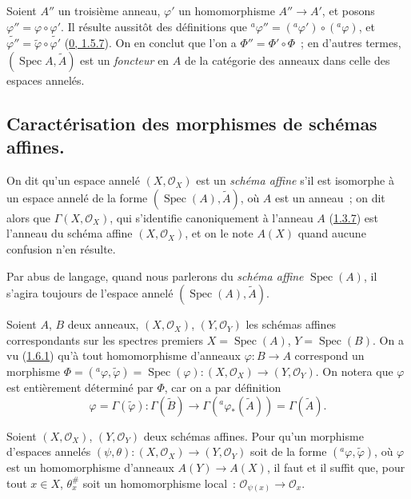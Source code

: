 \begin{env}[1.6.10]
\label{I.1.6.10-fr}
Soient $A''$ un troisième anneau, $\varphi'$ un homomorphisme
$A''\to A'$, et posons $\varphi''=\varphi\circ\varphi'$. Il résulte
aussitôt des définitions que
${}^a\varphi''=({}^a\varphi')\circ({}^a\varphi)$, et
$\widetilde{\varphi''}=\widetilde\varphi\circ\widetilde{\varphi'}$
(\hyperref[0.1.5.7-fr]{0, 1.5.7}). On en conclut que l'on a
$\Phi''=\Phi'\circ\Phi$~; en d'autres termes,
$(\operatorname{Spec} A,\widetilde A)$ est un \emph{foncteur} en $A$ de la
catégorie des anneaux dans celle des espaces annelés.
\end{env}

\subsection{Caractérisation des morphismes de schémas affines.}
\label{subsection:I.1.7-fr}

\begin{definition}[1.7.1]
\label{I.1.7.1-fr}
On dit qu'un espace annelé $(X,\mathscr{O}_X)$ est un \emph{schéma affine}
s'il est isomorphe à un espace annelé de la forme
$(\operatorname{Spec}(A),\widetilde A)$, où $A$ est un anneau~; on dit alors
que $\Gamma(X,\mathscr{O}_X)$, qui s'identifie canoniquement à l'anneau $A$
(\hyperref[I.1.3.7-fr]{1.3.7}) est l'anneau du schéma affine
$(X,\mathscr{O}_X)$, et on le note $A(X)$ quand aucune confusion n'en résulte.
\end{definition}

Par abus de langage, quand nous parlerons du \emph{schéma affine}
$\operatorname{Spec}(A)$, il s'agira toujours de l'espace annelé
$(\operatorname{Spec}(A),\widetilde A)$.

\begin{env}[1.7.2]
\label{I.1.7.2-fr}
Soient $A$, $B$ deux anneaux, $(X,\mathscr{O}_X)$,
$(Y,\mathscr{O}_Y)$ les schémas affines correspondants sur les spectres
premiers $X=\operatorname{Spec}(A)$, $Y=\operatorname{Spec}(B)$. On a vu
(\hyperref[I.1.6.1-fr]{1.6.1}) qu'à tout homomorphisme d'anneaux
$\varphi:B\to A$ correspond un morphisme
$\Phi=({}^a\varphi,\widetilde\varphi)=\operatorname{Spec}(\varphi):
(X,\mathscr{O}_X)\to(Y,\mathscr{O}_Y)$. On notera que $\varphi$ est
entièrement déterminé par $\Phi$, car on a par définition
\[
  \varphi=\Gamma(\widetilde\varphi):
  \Gamma(\widetilde B)\longrightarrow
  \Gamma({}^a\varphi_*(\widetilde A))=\Gamma(\widetilde A).
\]
\end{env}

\begin{theorem}[1.7.3]
\label{I.1.7.3-fr}
Soient $(X,\mathscr{O}_X)$, $(Y,\mathscr{O}_Y)$ deux schémas affines. Pour
qu'un morphisme d'espaces annelés
$(\psi,\theta):(X,\mathscr{O}_X)\to(Y,\mathscr{O}_Y)$ soit de la forme
$({}^a\varphi,\widetilde\varphi)$, où $\varphi$ est un homomorphisme
d'anneaux $A(Y)\to A(X)$, il faut et il suffit que, pour tout $x\in X$,
$\theta_x^{\#}$ soit un homomorphisme local~:
$\mathscr{O}_{\psi(x)}\to\mathscr{O}_x$.
\end{theorem}

